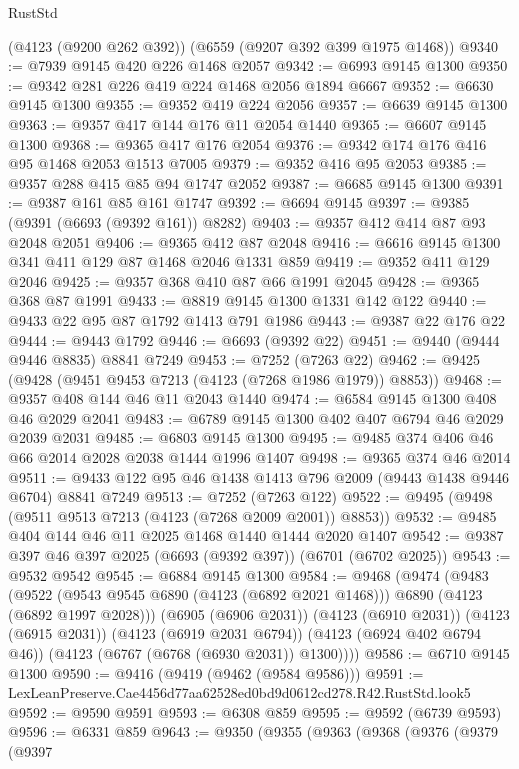 \begin{lexlean}{RustStd}
\begin{coremodule}
    (@4123 (@9200 @262 @392))
    (@6559 (@9207 @392 @399 @1975 @1468))
@9340 := @7939 @9145 @420 @226 @1468 @2057
@9342 := @6993 @9145 @1300
@9350 := @9342 @281 @226 @419 @224 @1468 @2056 @1894 @6667
@9352 := @6630 @9145 @1300
@9355 := @9352 @419 @224 @2056
@9357 := @6639 @9145 @1300
@9363 := @9357 @417 @144 @176 @11 @2054 @1440
@9365 := @6607 @9145 @1300
@9368 := @9365 @417 @176 @2054
@9376 := @9342 @174 @176 @416 @95 @1468 @2053 @1513 @7005
@9379 := @9352 @416 @95 @2053
@9385 := @9357 @288 @415 @85 @94 @1747 @2052
@9387 := @6685 @9145 @1300
@9391 := @9387 @161 @85 @161 @1747
@9392 := @6694 @9145
@9397 := @9385 (@9391 (@6693 (@9392 @161)) @8282)
@9403 := @9357 @412 @414 @87 @93 @2048 @2051
@9406 := @9365 @412 @87 @2048
@9416 := @6616 @9145 @1300 @341 @411 @129 @87 @1468 @2046 @1331 @859
@9419 := @9352 @411 @129 @2046
@9425 := @9357 @368 @410 @87 @66 @1991 @2045
@9428 := @9365 @368 @87 @1991
@9433 := @8819 @9145 @1300 @1331 @142 @122
@9440 := @9433 @22 @95 @87 @1792 @1413 @791 @1986
@9443 := @9387 @22 @176 @22
@9444 := @9443 @1792
@9446 := @6693 (@9392 @22)
@9451 := @9440 (@9444 @9446 @8835) @8841 @7249
@9453 := @7252 (@7263 @22)
@9462 := @9425 (@9428 (@9451 @9453 @7213 (@4123 (@7268 @1986 @1979)) @8853))
@9468 := @9357 @408 @144 @46 @11 @2043 @1440
@9474 := @6584 @9145 @1300 @408 @46 @2029 @2041
@9483 := @6789 @9145 @1300 @402 @407 @6794 @46 @2029 @2039 @2031
@9485 := @6803 @9145 @1300
@9495 := @9485 @374 @406 @46 @66 @2014 @2028 @2038 @1444 @1996 @1407
@9498 := @9365 @374 @46 @2014
@9511 := @9433 @122 @95 @46 @1438 @1413 @796 @2009 (@9443 @1438 @9446 @6704) @8841 @7249
@9513 := @7252 (@7263 @122)
@9522 := @9495 (@9498 (@9511 @9513 @7213 (@4123 (@7268 @2009 @2001)) @8853))
@9532 := @9485 @404 @144 @46 @11 @2025 @1468 @1440 @1444 @2020 @1407
@9542 := @9387 @397 @46 @397 @2025 (@6693 (@9392 @397)) (@6701 (@6702 @2025))
@9543 := @9532 @9542
@9545 := @6884 @9145 @1300
@9584 := @9468
    (@9474
      (@9483
        (@9522 (@9543 @9545 @6890 (@4123 (@6892 @2021 @1468))) @6890 (@4123 (@6892 @1997 @2028)))
        (@6905 (@6906 @2031))
        (@4123 (@6910 @2031))
        (@4123 (@6915 @2031))
        (@4123 (@6919 @2031 @6794))
        (@4123 (@6924 @402 @6794 @46))
        (@4123 (@6767 (@6768 (@6930 @2031)) @1300))))
@9586 := @6710 @9145 @1300
@9590 := @9416 (@9419 (@9462 (@9584 @9586)))
@9591 := LexLeanPreserve.Cae4456d77aa62528ed0bd9d0612cd278.R42.RustStd.look5
@9592 := @9590 @9591
@9593 := @6308 @859
@9595 := @9592 (@6739 @9593)
@9596 := @6331 @859
@9643 := @9350
    (@9355
      (@9363
        (@9368
          (@9376
            (@9379
              (@9397

\end{coremodule}
\end{lexlean}
